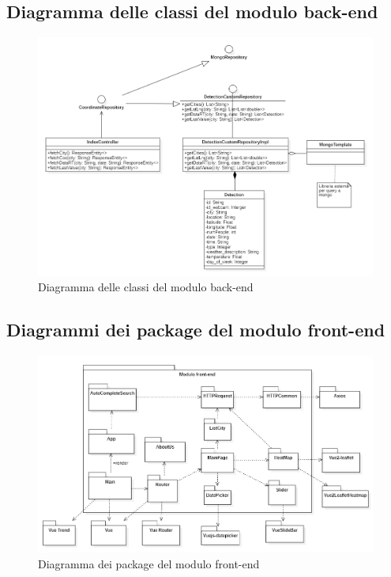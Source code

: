 \subsection{Diagramma delle classi del modulo back-end}
\begin{center}
	\begin{figure}[H]
		\centering\includegraphics[scale=0.65]{../immagini/diag_PB/diag_class_spring.png}
		\caption{Diagramma delle classi del modulo back-end}
	\end{figure}
\end{center}
\subsection{Diagrammi dei package del modulo front-end}
\begin{center}
	\begin{figure}[H]
		\centering\includegraphics[scale=0.7]{../immagini/diag_PB/diag_pack_vue.png}
		\caption{Diagramma dei package del modulo front-end}
	\end{figure}
\end{center}
